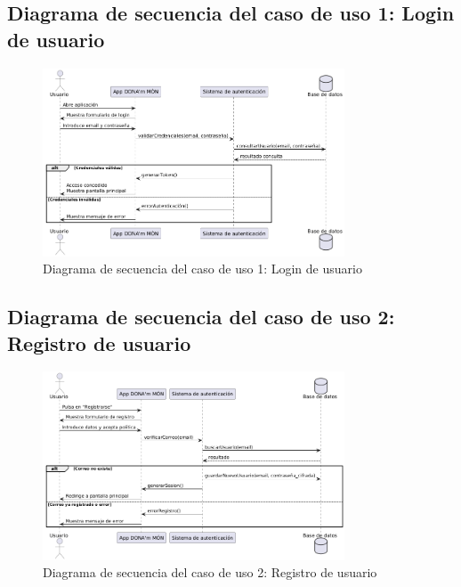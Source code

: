 \subsection{Diagrama de secuencia del caso de uso 1: Login de usuario}
\begin{figure}[H]
    \centering
    \includegraphics[width=0.8\textwidth]{figs/caso1.png}
    \caption{Diagrama de secuencia del caso de uso 1: Login de usuario}
\end{figure}

\clearpage
\subsection{Diagrama de secuencia del caso de uso 2: Registro de usuario}
\begin{figure}[H]
    \centering
    \includegraphics[width=0.8\textwidth]{figs/caso2.png}
    \caption{Diagrama de secuencia del caso de uso 2: Registro de usuario}
\end{figure}


